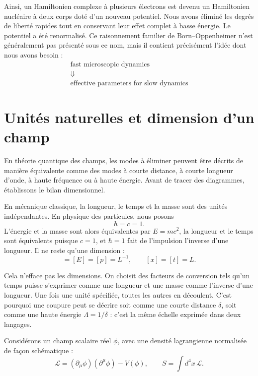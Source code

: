 Ainsi, un Hamiltonien complexe à plusieurs électrons est devenu un Hamiltonien nucléaire à deux corps doté d’un nouveau potentiel. Nous avons éliminé les degrés de liberté rapides tout en conservant leur effet complet à basse énergie. Le potentiel a été renormalisé. Ce raisonnement familier de Born--Oppenheimer n’est généralement pas présenté sous ce nom, mais il contient précisément l’idée dont nous avons besoin :
\begin{equation}
\begin{gathered}
\text{fast microscopic dynamics}\\
\Downarrow\\
\text{effective parameters for slow dynamics}
\end{gathered}
\end{equation}

\section{Unités naturelles et dimension d’un champ}

En théorie quantique des champs, les modes à éliminer peuvent être décrits de manière équivalente comme des modes à courte distance, à courte longueur d’onde, à haute fréquence ou à haute énergie. Avant de tracer des diagrammes, établissons le bilan dimensionnel.

En mécanique classique, la longueur, le temps et la masse sont des unités indépendantes. En physique des particules, nous posons
\begin{equation}
\hbar=c=1.
\end{equation}
L’énergie et la masse sont alors équivalentes par \(E=mc^2\), la longueur et le temps sont équivalents puisque \(c=1\), et \(\hbar=1\) fait de l’impulsion l’inverse d’une longueur. Il ne reste qu’une dimension :
\begin{equation}
[M]=[E]=[p]=L^{-1},
\qquad
[x]=[t]=L.
\label{eq:natural-units}
\end{equation}

Cela n’efface pas les dimensions. On choisit des facteurs de conversion tels qu’un temps puisse s’exprimer comme une longueur et une masse comme l’inverse d’une longueur. Une fois une unité spécifiée, toutes les autres en découlent. C’est pourquoi une coupure peut se décrire soit comme une courte distance \(\delta\), soit comme une haute énergie \(\Lambda=1/\delta\) : c’est la même échelle exprimée dans deux langages.

Considérons un champ scalaire réel \(\phi\), avec une densité lagrangienne normalisée de façon schématique :
\begin{equation}
\mathcal L=(\partial_\mu\phi)(\partial^\mu\phi)-V(\phi),
\qquad
S=\int d^4x\,\mathcal L.
\label{eq:scalar-action}
\end{equation}

